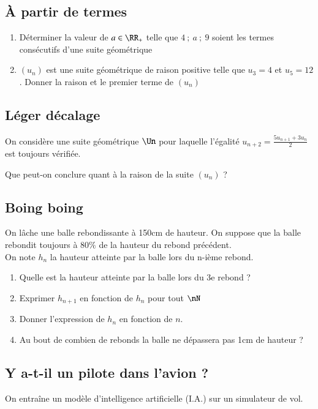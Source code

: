 \documentclass[oneside,12pt]{article}          %
\begin{document}
\subsection{À partir de termes}

\begin{enumerate}
    \item Déterminer la valeur de $a\in\RR_{+}$ telle que $4~;~a~;~9$ soient les termes consécutifs d'une suite géométrique
    \item  $(u_n)$ est une suite géométrique de raison positive telle que $u_{3}=4$ et $u_{5}=12$. Donner la raison et le premier terme de $(u_n)$
\end{enumerate}



\subsection{Léger décalage}

On considère une suite géométrique $\Un$ pour laquelle l'égalité $u_{n+2}=\frac{5u_{n+1}+3u_n}{2}$ est toujours vérifiée.

Que peut-on conclure quant à la raison de la suite $(u_n)$ ?


\subsection{Boing boing}
On lâche une balle rebondissante à 150cm de hauteur. On suppose que la balle rebondit toujours à 80$\%$ de la hauteur du rebond précédent. \\
On note $h_{n}$ la hauteur atteinte par la balle lors du n-ième rebond.

\begin{enumerate}
    \item Quelle est la hauteur atteinte par la balle lors du 3e rebond ?
    \item Exprimer $h_{n+1}$ en fonction de $h_{n}$ pour tout $\nN$
    \item Donner l'expression de $h_{n}$ en fonction de $n$.
    \item[\faCalculator] Au bout de combien de rebonds la balle ne dépassera pas 1cm de hauteur ?
\end{enumerate}



\subsection{Y a-t-il un pilote dans l'avion ?}
On entraîne un modèle d'intelligence artificielle (I.A.) sur un simulateur de vol.
\end{document}
